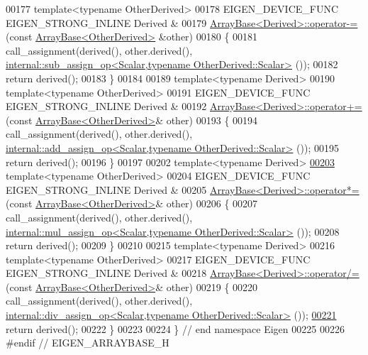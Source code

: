 \begin{DoxyCode}
00177 \textcolor{keyword}{template}<\textcolor{keyword}{typename} OtherDerived>
00178 EIGEN\_DEVICE\_FUNC EIGEN\_STRONG\_INLINE Derived &
00179 \hyperlink{group___core___module_class_eigen_1_1_array_base}{ArrayBase<Derived>::operator-=}(\textcolor{keyword}{const} 
      \hyperlink{group___core___module_class_eigen_1_1_array_base}{ArrayBase<OtherDerived>} &other)
00180 \{
00181   call\_assignment(derived(), other.derived(), 
      \hyperlink{struct_eigen_1_1internal_1_1sub__assign__op}{internal::sub\_assign\_op<Scalar,typename OtherDerived::Scalar>}
      ());
00182   \textcolor{keywordflow}{return} derived();
00183 \}
00184 
00189 \textcolor{keyword}{template}<\textcolor{keyword}{typename} Derived>
00190 \textcolor{keyword}{template}<\textcolor{keyword}{typename} OtherDerived>
00191 EIGEN\_DEVICE\_FUNC EIGEN\_STRONG\_INLINE Derived &
00192 \hyperlink{group___core___module_class_eigen_1_1_array_base}{ArrayBase<Derived>::operator+=}(\textcolor{keyword}{const} 
      \hyperlink{group___core___module_class_eigen_1_1_array_base}{ArrayBase<OtherDerived>}& other)
00193 \{
00194   call\_assignment(derived(), other.derived(), 
      \hyperlink{struct_eigen_1_1internal_1_1add__assign__op}{internal::add\_assign\_op<Scalar,typename OtherDerived::Scalar>}
      ());
00195   \textcolor{keywordflow}{return} derived();
00196 \}
00197 
00202 \textcolor{keyword}{template}<\textcolor{keyword}{typename} Derived>
\hyperlink{group___core___module_abe1bff4421b16e62e75f932b83c4d31f}{00203} \textcolor{keyword}{template}<\textcolor{keyword}{typename} OtherDerived>
00204 EIGEN\_DEVICE\_FUNC EIGEN\_STRONG\_INLINE Derived &
00205 \hyperlink{group___core___module_a3fc54e548f88415c3582add526b62525}{ArrayBase<Derived>::operator*=}(\textcolor{keyword}{const} 
      \hyperlink{group___core___module_class_eigen_1_1_array_base}{ArrayBase<OtherDerived>}& other)
00206 \{
00207   call\_assignment(derived(), other.derived(), 
      \hyperlink{struct_eigen_1_1internal_1_1mul__assign__op}{internal::mul\_assign\_op<Scalar,typename OtherDerived::Scalar>}
      ());
00208   \textcolor{keywordflow}{return} derived();
00209 \}
00210 
00215 \textcolor{keyword}{template}<\textcolor{keyword}{typename} Derived>
00216 \textcolor{keyword}{template}<\textcolor{keyword}{typename} OtherDerived>
00217 EIGEN\_DEVICE\_FUNC EIGEN\_STRONG\_INLINE Derived &
00218 \hyperlink{group___core___module_a91860c840ac453449c1ac65fc61065f8}{ArrayBase<Derived>::operator/=}(\textcolor{keyword}{const} 
      \hyperlink{group___core___module_class_eigen_1_1_array_base}{ArrayBase<OtherDerived>}& other)
00219 \{
00220   call\_assignment(derived(), other.derived(), 
      \hyperlink{struct_eigen_1_1internal_1_1div__assign__op}{internal::div\_assign\_op<Scalar,typename OtherDerived::Scalar>}
      ());
\hyperlink{group___core___module_a8f857f93533ac386282f47c5ef05459a}{00221}   \textcolor{keywordflow}{return} derived();
00222 \}
00223 
00224 \} \textcolor{comment}{// end namespace Eigen}
00225 
00226 \textcolor{preprocessor}{#endif // EIGEN\_ARRAYBASE\_H}
\end{DoxyCode}
